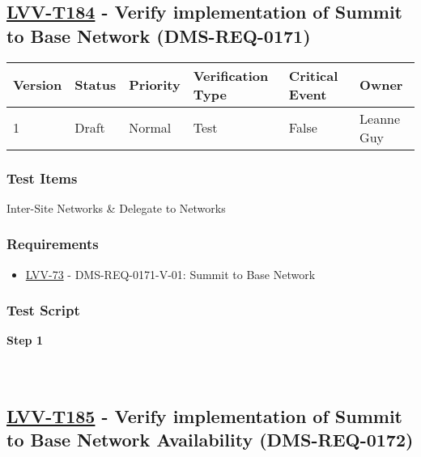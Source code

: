 \hypertarget{lvv-t184---verify-implementation-of-summit-to-base-network-dms-req-0171}{%
\subsection{\texorpdfstring{\href{https://jira.lsstcorp.org/secure/Tests.jspa\#/testCase/LVV-T184}{LVV-T184}
- Verify implementation of Summit to Base Network
(DMS-REQ-0171)}{LVV-T184 - Verify implementation of Summit to Base Network (DMS-REQ-0171)}}\label{lvv-t184---verify-implementation-of-summit-to-base-network-dms-req-0171}}

\begin{longtable}[]{@{}llllll@{}}
\toprule
Version & Status & Priority & Verification Type & Critical Event &
Owner\tabularnewline
\midrule
\endhead
1 & Draft & Normal & Test & False & Leanne Guy\tabularnewline
\bottomrule
\end{longtable}

\hypertarget{test-items-160}{%
\subsubsection{Test Items}\label{test-items-160}}

Inter-Site Networks \& Delegate to Networks

\hypertarget{requirements-161}{%
\subsubsection{Requirements}\label{requirements-161}}

\begin{itemize}
\tightlist
\item
  \href{https://jira.lsstcorp.org/browse/LVV-73}{LVV-73} -
  DMS-REQ-0171-V-01: Summit to Base Network
\end{itemize}

\hypertarget{test-script-161}{%
\subsubsection{Test Script}\label{test-script-161}}

\textbf{Step 1}\\
~\\
~\\

\hypertarget{lvv-t185---verify-implementation-of-summit-to-base-network-availability-dms-req-0172}{%
\subsection{\texorpdfstring{\href{https://jira.lsstcorp.org/secure/Tests.jspa\#/testCase/LVV-T185}{LVV-T185}
- Verify implementation of Summit to Base Network Availability
(DMS-REQ-0172)}{LVV-T185 - Verify implementation of Summit to Base Network Availability (DMS-REQ-0172)}}\label{lvv-t185---verify-implementation-of-summit-to-base-network-availability-dms-req-0172}}

